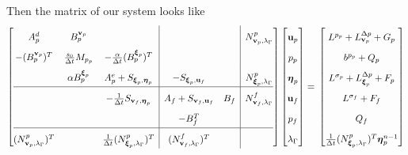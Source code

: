 \documentclass{article}
\newcommand{\mathspace}[1]{\ensuremath{#1}\xspace} %
\newcommand{\dt}{\mathspace{\Delta t}}
\newcommand{\matzero}{}        %
\newcommand{\uf}{\mathspace{\mathbf{u}_f}}
\newcommand{\vf}{\mathspace{\mathbf{v}_f}}
\newcommand{\up}{\mathspace{\mathbf{u}_p}}
\newcommand{\vp}{\mathspace{\mathbf{v}_p}}
\newcommand{\pf}{\mathspace{p_f}}
\newcommand{\pp}{\mathspace{p_p}}
\newcommand{\wf}{\mathspace{w_f}}
\renewcommand{\wp}{\mathspace{w_p}}
\newcommand{\disp}{\mathspace{\boldsymbol{\eta}_p}}
\newcommand{\disptest}{\mathspace{\boldsymbol{\xi}_p}}
\newcommand{\mult}{\mathspace{\lambda_{\Gamma}}}
\newcommand{\multtest}{\mathspace{\mu_{\Gamma}}}
\begin{document}
Then the matrix of our system looks like
\[ \renewcommand{\arraystretch}{1.8}
  \left[\begin{array}{@{}ccc|cc|c@{}}
          
          A^d_p & B^{\vp}_p & \matzero & \matzero & \matzero & N^p_{\vp, \mult} \\ %
          - (B^{\vp}_p)^T & \frac {s_0}{\dt} M_{\pp} & - \frac{\alpha}{\dt} (B^{\disptest}_p)^T & \matzero & \matzero & \matzero\\ %
          \matzero & \alpha B^{\disptest}_p & A^e_p + S_{\disptest, \disp} & - S_{\disptest, \uf} & \matzero & N^p_{\disptest, \mult}\\ %
          \hline
          \matzero & \matzero & - \frac 1 {\dt} S_{\vf, \disp} & A_f + S_{\vf, \uf} & B_f & N^f_{\vf, \mult}\\ %
          \matzero & \matzero & \matzero & -B_f^T & \matzero & \matzero \\ %
          \hline
          (N^p_{\vp, \mult})^T & \matzero & \frac 1 {\dt} (N^p_{\disptest, \mult})^T & (N^f_{\vf, \mult})^T & \matzero & \matzero \\ %

        \end{array}\right]
      \left[\begin{array}{@{}c@{}}
                \up \\
                \pp \\
                \disp \\
                \uf \\
                \pf \\
                \mult
            \end{array}\right]
          = \newline
                      \left[\begin{array}{@{}c@{}}
                L^{\pp} + L_{\vp}^{\Delta p} + G_p\\
                              b^{\pp}  + Q_p \\
                              L^{\sigma_p} + L_{\disptest}^{\Delta p} + F_p\\
                L^{\sigma_f} + F_f\\
                Q_f \\
                \frac 1 {\dt} (N^p_{\disptest, \mult})^T \disp^{n-1} \\
        \end{array}\right]
    \]
\end{document}

